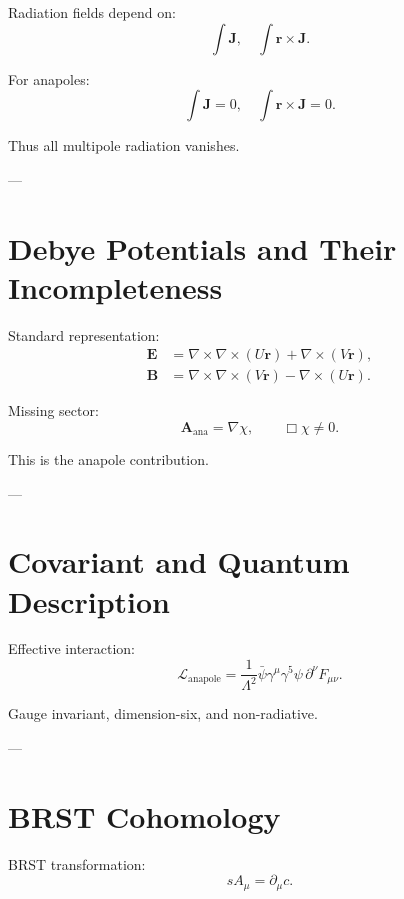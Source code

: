 \documentclass[11pt]{article}
\begin{document}
Radiation fields depend on:
\begin{equation}
\int \mathbf{J}, \quad \int \mathbf{r}\times\mathbf{J}.
\end{equation}

For anapoles:
\begin{equation}
\int \mathbf{J} = 0, \quad \int \mathbf{r}\times\mathbf{J} = 0.
\end{equation}

Thus all multipole radiation vanishes.

---

\section{Debye Potentials and Their Incompleteness}

Standard representation:
\begin{align}
\mathbf{E} &= \nabla\times\nabla\times(U\mathbf{r}) + \nabla\times(V\mathbf{r}), \\
\mathbf{B} &= \nabla\times\nabla\times(V\mathbf{r}) - \nabla\times(U\mathbf{r}).
\end{align}

Missing sector:
\begin{equation}
\mathbf{A}_{\text{ana}} = \nabla \chi,
\qquad \Box \chi \neq 0.
\end{equation}

This is the anapole contribution.

---

\section{Covariant and Quantum Description}

Effective interaction:
\begin{equation}
\mathcal{L}_{\text{anapole}}
=
\frac{1}{\Lambda^2}
\bar{\psi}\gamma^\mu\gamma^5\psi\,
\partial^\nu F_{\mu\nu}.
\end{equation}

Gauge invariant, dimension-six, and non-radiative.

---

\section{BRST Cohomology}

BRST transformation:
\begin{equation}
sA_\mu = \partial_\mu c.
\end{equation}
\end{document}

